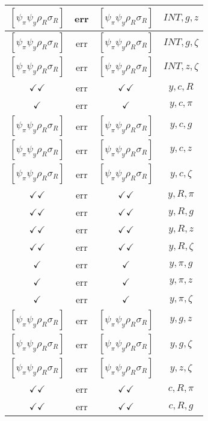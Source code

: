 \documentclass[a4paper,10pt]{article}
\begin{document}
\begin{longtable}{|c|c|c|c|}
\hline
$[\psi_\pi \psi_y \rho_R \sigma_R ]$ & err & $[\psi_\pi \psi_y \rho_R \sigma_R ]$ & ${INT},{g},{z}$ \\
\hline
$[\psi_\pi \psi_y \rho_R \sigma_R ]$ & err & $[\psi_\pi \psi_y \rho_R \sigma_R ]$ & ${INT},{g},{\zeta}$ \\
\hline
$[\psi_\pi \psi_y \rho_R \sigma_R ]$ & err & $[\psi_\pi \psi_y \rho_R \sigma_R ]$ & ${INT},{z},{\zeta}$ \\
\hline
$\checkmark\checkmark$ & err & $\checkmark\checkmark$ & ${y},{c},{R}$ \\
\hline
$\checkmark$ & err & $\checkmark$ & ${y},{c},{\pi}$ \\
\hline
$[\psi_\pi \psi_y \rho_R \sigma_R ]$ & err & $[\psi_\pi \psi_y \rho_R \sigma_R ]$ & ${y},{c},{g}$ \\
\hline
$[\psi_\pi \psi_y \rho_R \sigma_R ]$ & err & $[\psi_\pi \psi_y \rho_R \sigma_R ]$ & ${y},{c},{z}$ \\
\hline
$[\psi_\pi \psi_y \rho_R \sigma_R ]$ & err & $[\psi_\pi \psi_y \rho_R \sigma_R ]$ & ${y},{c},{\zeta}$ \\
\hline
$\checkmark\checkmark$ & err & $\checkmark\checkmark$ & ${y},{R},{\pi}$ \\
\hline
$\checkmark\checkmark$ & err & $\checkmark\checkmark$ & ${y},{R},{g}$ \\
\hline
$\checkmark\checkmark$ & err & $\checkmark\checkmark$ & ${y},{R},{z}$ \\
\hline
$\checkmark\checkmark$ & err & $\checkmark\checkmark$ & ${y},{R},{\zeta}$ \\
\hline
$\checkmark$ & err & $\checkmark$ & ${y},{\pi},{g}$ \\
\hline
$\checkmark$ & err & $\checkmark$ & ${y},{\pi},{z}$ \\
\hline
$\checkmark$ & err & $\checkmark$ & ${y},{\pi},{\zeta}$ \\
\hline
$[\psi_\pi \psi_y \rho_R \sigma_R ]$ & err & $[\psi_\pi \psi_y \rho_R \sigma_R ]$ & ${y},{g},{z}$ \\
\hline
$[\psi_\pi \psi_y \rho_R \sigma_R ]$ & err & $[\psi_\pi \psi_y \rho_R \sigma_R ]$ & ${y},{g},{\zeta}$ \\
\hline
$[\psi_\pi \psi_y \rho_R \sigma_R ]$ & err & $[\psi_\pi \psi_y \rho_R \sigma_R ]$ & ${y},{z},{\zeta}$ \\
\hline
$\checkmark\checkmark$ & err & $\checkmark\checkmark$ & ${c},{R},{\pi}$ \\
\hline
$\checkmark\checkmark$ & err & $\checkmark\checkmark$ & ${c},{R},{g}$ \\

\end{longtable}
\end{document}
